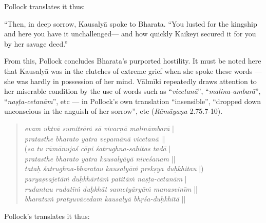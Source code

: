 Pollock translates it thus:

\begin{myquote}
“Then, in deep sorrow, Kausalyā spoke to Bharata. “You lusted for the kingship and here you have it unchallenged--- and how quickly Kaikeyī secured it for you by her savage deed.”
\end{myquote}

From this, Pollock concludes Bharata’s purported hostility. It must be noted here that Kausalyā was in the clutches of extreme grief when she spoke these words --- she was hardly in possession of her mind. Vālmīki repeatedly draws attention to her miserable condition by the use of words such as “{\sl vicetanā}”, “{\sl malina-ambarā}”, “{\sl naṣṭa-cetanām}”, etc --- in Pollock’s own translation “insensible”, “dropped down unconscious in the anguish of her sorrow”, etc ({\sl Rāmāyaṇa} 2.75.7-10).
\begin{quote}
{{\sl evam uktvā sumitrāṁ sā vivarṇā malināmbarā}}\label{verse20} |\\
{\sl pratasthe bharato yatra vepamānā vicetanā} ||\\
({\sl sa tu rāmānujaś cāpi śatrughna-sahitas tadā}\label{verse21} |\\
{\sl pratasthe bharato yatra kausalyāyā niveśanam} ||\\ 
{\sl tataḥ śatrughna-bharatau kausalyāṁ prekṣya duḥkhitau} |)\\
{\sl paryaṣvajetāṁ duḥkhārtāṁ patitāṁ naṣṭa-cetanām}\label{verse22} |\\
{\sl rudantau rudatīṁ duḥkhāt sametyāryāṁ manasvinīm} ||\\
{\sl bharataṁ pratyuvācedam kausalyā bhṛśa-duḥkhitā}\label{verse23} || 
\end{quote}
\vskip -5pt

Pollock’s translates it thus:
\vskip -5pt


